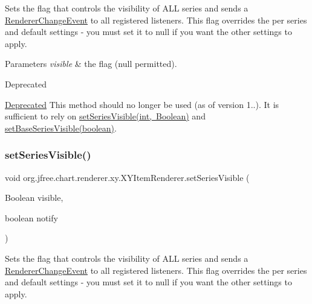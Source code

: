 Sets the flag that controls the visibility of A\+LL series and sends a \mbox{\hyperlink{}{Renderer\+Change\+Event}} to all registered listeners. This flag overrides the per series and default settings -\/ you must set it to {\ttfamily null} if you want the other settings to apply.


\begin{DoxyParams}{Parameters}
{\em visible} & the flag ({\ttfamily null} permitted).\\
\hline
\end{DoxyParams}
\begin{DoxyRefDesc}{Deprecated}
\item[\mbox{\hyperlink{deprecated__deprecated000214}{Deprecated}}]This method should no longer be used (as of version 1..). It is sufficient to rely on \mbox{\hyperlink{interfaceorg_1_1jfree_1_1chart_1_1renderer_1_1xy_1_1_x_y_item_renderer_a602bc5ae9818a0567f42436dc0560157}{set\+Series\+Visible(int, Boolean)}} and \mbox{\hyperlink{interfaceorg_1_1jfree_1_1chart_1_1renderer_1_1xy_1_1_x_y_item_renderer_a223f697346a47561ead7d43ebdb9fb84}{set\+Base\+Series\+Visible(boolean)}}. \end{DoxyRefDesc}
\mbox{\label{interfaceorg_1_1jfree_1_1chart_1_1renderer_1_1xy_1_1_x_y_item_renderer_abbfd4ecf40f8ec2daa278f67b3e20591}} 
\subsubsection{\texorpdfstring{set\+Series\+Visible()}{setSeriesVisible()}\hspace{0.1cm}{\footnotesize\ttfamily [4/4]}}
{\footnotesize\ttfamily void org.\+jfree.\+chart.\+renderer.\+xy.\+X\+Y\+Item\+Renderer.\+set\+Series\+Visible (\begin{DoxyParamCaption}\item[{Boolean}]{visible,  }\item[{boolean}]{notify }\end{DoxyParamCaption})}

Sets the flag that controls the visibility of A\+LL series and sends a \mbox{\hyperlink{}{Renderer\+Change\+Event}} to all registered listeners. This flag overrides the per series and default settings -\/ you must set it to {\ttfamily null} if you want the other settings to apply.


